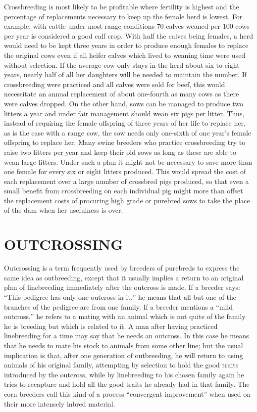 Crossbreeding is most likely to be profitable where fertility is highest
and the percentage of replacements necessary to keep up the female
herd is lowest. For example, with cattle under most range conditions 70
calves weaned per 100 cows per year is considered a good calf crop. With
half the calves being females, a herd would need to be kept three years
in order to produce enough females to replace the original cows even if
all heifer calves which lived to weaning time were used without selection.
If the average cow only stays in the herd about six to eight years,
nearly half of all her daughters will be needed to maintain the number.
If crossbreeding were practiced and all calves were sold for beef, this
would necessitate an annual replacement of about one-fourth as many
cows as there were calves dropped. On the other hand, sows can be
managed to produce two litters a year and under fair management
should wean six pigs per litter. Thus, instead of requiring the female
offspring of three years of her life to replace her, as is the case with a
range cow, the sow needs only one-sixth of one year's female offspring to
replace her. Many swine breeders who practice crossbreeding try to raise
two litters per year and keep their old sows as long as these are able to
wean large litters. Under such a plan it might not be necessary to save
more than one female for every six or eight litters produced. This would
spread the cost of each replacement over a large number of crossbred
pigs produced, so that even a small benefit from crossbreeding on each
individual pig might more than offset the replacement costs of procuring
high grade or purebred sows to take the place of the dam when her
usefulness is over.

\section*{OUTCROSSING}

Outcrossing is a term frequently used by breeders of purebreds to
express the same idea as outbreeding, except that it usually implies a
return to an original plan of linebreeding immediately after the outcross
is made. If a breeder says: ``This pedigree has only one outcross in
it,'' he means that all but one of the branches of the pedigree are from
one family. If a breeder mentions a ``mild outcross,'' he refers to a mating
with an animal which is not quite of the family he is breeding but
which is related to it. A man after having practiced linebreeding for a
time may say that he needs an outcross. In this case he means that he
needs to mate his stock to animals from some other line; but the usual
implication is that, after one generation of outbreeding, he will return
to using animals of his original family, attempting by selection to hold
the good traits introduced by the outcross, while by linebreeding to his
chosen family again he tries to recapture and hold all the good traits he
already had in that family. The corn breeders call this kind of a process
``convergent improvement'' when used on their more intensely inbred
material.

